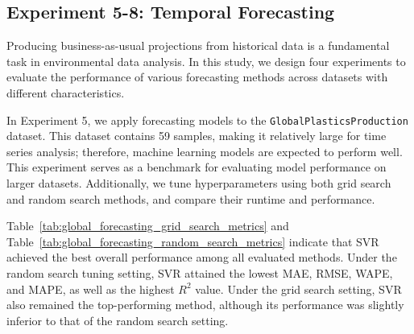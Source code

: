 \subsection{Experiment 5-8: Temporal Forecasting}


Producing business-as-usual projections from historical data is a fundamental task in environmental data analysis. In this study, we design four experiments to evaluate the performance of various forecasting methods across datasets with different characteristics.

In Experiment 5, we apply forecasting models to the \texttt{GlobalPlasticsProduction} dataset. This dataset contains 59 samples, making it relatively large for time series analysis; therefore, machine learning models are expected to perform well. This experiment serves as a benchmark for evaluating model performance on larger datasets. Additionally, we tune hyperparameters using both grid search and random search methods, and compare their runtime and performance.






Table~\ref{tab:global_forecasting_grid_search_metrics} and Table~\ref{tab:global_forecasting_random_search_metrics} indicate that SVR achieved the best overall performance among all evaluated methods. Under the random search tuning setting, SVR attained the lowest MAE, RMSE, WAPE, and MAPE, as well as the highest \(R^2\) value. Under the grid search setting, SVR also remained the top-performing method, although its performance was slightly inferior to that of the random search setting.

